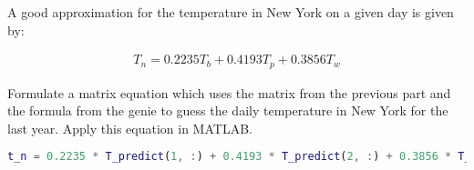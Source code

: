 A good approximation for the temperature in New York on a given day is given by: 

\begin{align*}
    T_n = 0.2235T_b + 0.4193T_p + 0.3856T_w
\end{align*}

Formulate a matrix equation which uses the matrix from the previous part and the formula from the genie to guess the daily temperature in New York for the last year. Apply this equation in MATLAB.

\begin{solution}
\begin{lstlisting}[language=Matlab]
t_n = 0.2235 * T_predict(1, :) + 0.4193 * T_predict(2, :) + 0.3856 * T_predict(3, :)
\end{lstlisting}
\end{solution}
